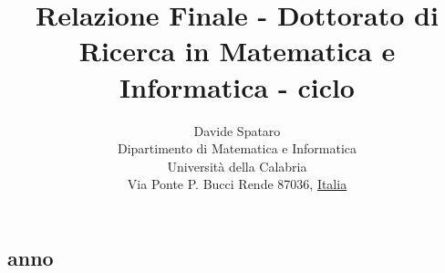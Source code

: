 \documentclass[a4paper,11pt]{paper}
\newcommand{\RNum}[1]{\uppercase\expandafter{\romannumeral #1\relax}}
\begin{document}
	\title{Relazione Finale - Dottorato di Ricerca in Matematica e
		Informatica - \RNum{30} ciclo}
	\author{
		Davide Spataro \\
		Dipartimento di Matematica e Informatica\\
		Università della Calabria\\
		Via Ponte P. Bucci Rende 87036, \underline{Italia}
	}
	
	
	
	\maketitle
	 

	
	\begin{abstract}

	\end{abstract}
	\newpage
	\tableofcontents





\newpage
\subsection{\RNum{3} anno}


	
\end{document}
